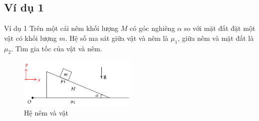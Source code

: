 \subsection{Ví dụ 1}
\begin{frame}{Ví dụ 1}
Trên một cái nêm khối lượng \(M\) có góc nghiêng \(\alpha\) so với mặt đất đặt một vật có khối lượng \(m\). Hệ số ma sát giữa vật và nêm là \(\mu_1\), giữa nêm và mặt đất là \(\mu_2\). Tìm gia tốc của vật và nêm.
\begin{figure}
    \centering
    \includegraphics[width=0.5\textwidth]{Slides/Figure/wedgemass.png}
    \caption{Hệ nêm và vật}
\end{figure}
\end{frame}

